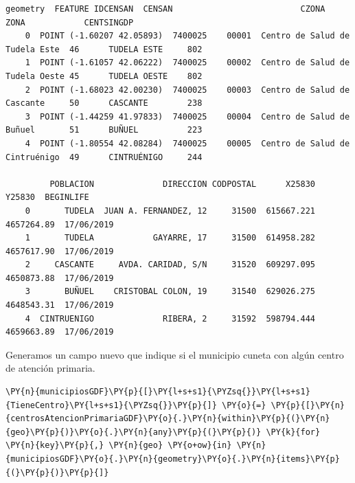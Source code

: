 \begin{tcolorbox}[breakable, size=fbox, boxrule=.5pt, pad at break*=1mm, opacityfill=0, fontupper=\tiny]
    \begin{Verbatim}[commandchars=\\\{\}]
                        geometry  FEATURE IDCENSAN  CENSAN                          CZONA   ZONA            CENTSINGDP
    0  POINT (-1.60207 42.05893)  7400025    00001  Centro de Salud de Tudela Este  46      TUDELA ESTE     802
    1  POINT (-1.61057 42.06222)  7400025    00002  Centro de Salud de Tudela Oeste 45      TUDELA OESTE    802
    2  POINT (-1.68023 42.00230)  7400025    00003  Centro de Salud de Cascante     50      CASCANTE        238
    3  POINT (-1.44259 41.97833)  7400025    00004  Centro de Salud de Buñuel       51      BUÑUEL          223
    4  POINT (-1.80554 42.08284)  7400025    00005  Centro de Salud de Cintruénigo  49      CINTRUÉNIGO     244
    
         POBLACION              DIRECCION CODPOSTAL      X25830      Y25830  BEGINLIFE
    0       TUDELA  JUAN A. FERNANDEZ, 12     31500  615667.221  4657264.89  17/06/2019
    1       TUDELA            GAYARRE, 17     31500  614958.282  4657617.90  17/06/2019
    2     CASCANTE     AVDA. CARIDAD, S/N     31520  609297.095  4650873.88  17/06/2019
    3       BUÑUEL    CRISTOBAL COLON, 19     31540  629026.275  4648543.31  17/06/2019
    4  CINTRUENIGO              RIBERA, 2     31592  598794.444  4659663.89  17/06/2019
\end{Verbatim}
\end{tcolorbox}

Generamos un campo nuevo que indique si el municipio cuneta con algún centro de atención primaria.

\begin{tcolorbox}[breakable, size=fbox, boxrule=1pt, pad at break*=1mm,colback=cellbackground, colframe=cellborder, fontupper=\footnotesize]
    \begin{Verbatim}[commandchars=\\\{\}]
    \PY{n}{municipiosGDF}\PY{p}{[}\PY{l+s+s1}{\PYZsq{}}\PY{l+s+s1}{TieneCentro}\PY{l+s+s1}{\PYZsq{}}\PY{p}{]} \PY{o}{=} \PY{p}{[}\PY{n}{centrosAtencionPrimariaGDF}\PY{o}{.}\PY{n}{within}\PY{p}{(}\PY{n}{geo}\PY{p}{)}\PY{o}{.}\PY{n}{any}\PY{p}{(}\PY{p}{)} \PY{k}{for} \PY{n}{key}\PY{p}{,} \PY{n}{geo} \PY{o+ow}{in} \PY{n}{municipiosGDF}\PY{o}{.}\PY{n}{geometry}\PY{o}{.}\PY{n}{items}\PY{p}{(}\PY{p}{)}\PY{p}{]}
    \end{Verbatim}
\end{tcolorbox}        

